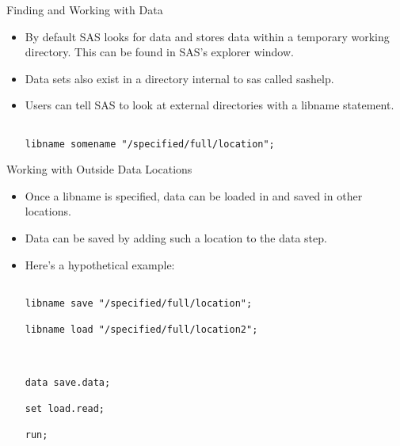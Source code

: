 \documentclass{beamer}
\begin{document}
\begin{frame}[fragile]{Finding and Working with Data}

\begin{itemize}

\item By default SAS looks for data and stores data within a temporary working directory.  This can be found in SAS's explorer window.

\item Data sets also exist in a directory internal to sas called sashelp.

\item Users can tell SAS to look at external directories with a libname statement.

\begin{verbatim}

libname somename "/specified/full/location";

\end{verbatim}

\end{itemize}

\end{frame}



\begin{frame}[fragile]{Working with Outside Data Locations}

\begin{itemize}

\item Once a libname is specified, data can be loaded in and saved in other locations.

\item Data can be saved by adding such a location to the data step.



\item Here's a hypothetical example:

\begin{verbatim}

libname save "/specified/full/location";

libname load "/specified/full/location2";



data save.data;

set load.read;

run;

\end{verbatim}

\end{itemize}

\end{frame}
\end{document}

